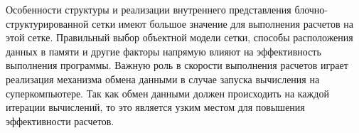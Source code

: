 Особенности структуры и реализации внутреннего представления блочно-структурированной сетки имеют большое значение для выполнения расчетов на этой сетке.
Правильный выбор объектной модели сетки, способы расположения данных в памяти и другие факторы напрямую влияют на эффективность выполнения программы.
Важную роль в скорости выполнения расчетов играет реализация механизма обмена данными в случае запуска вычисления на суперкомпьютере.
Так как обмен данными должен происходить на каждой итерации вычислений, то это является узким местом для повышения эффективности расчетов.
